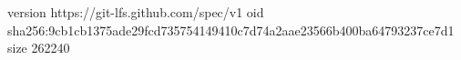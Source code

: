 version https://git-lfs.github.com/spec/v1
oid sha256:9cb1cb1375ade29fcd735754149410c7d74a2aae23566b400ba64793237ce7d1
size 262240
